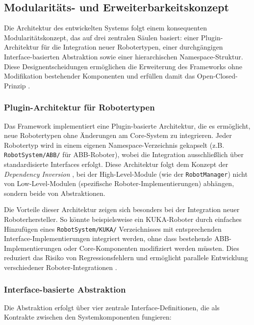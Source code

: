 \subsection{Modularitäts- und Erweiterbarkeitskonzept}

Die Architektur des entwickelten Systems folgt einem konsequenten
Modularitätskonzept, das auf drei zentralen Säulen basiert: einer
Plugin-Architektur für die Integration neuer Robotertypen, einer durchgängigen
Interface-basierten Abstraktion sowie einer hierarchischen Namespace-Struktur.
Diese Designentscheidungen ermöglichen die Erweiterung des Frameworks ohne
Modifikation bestehender Komponenten und erfüllen damit das Open-Closed-Prinzip
\cite{martin2003agile}.

\subsubsection{Plugin-Architektur für Robotertypen}

Das Framework implementiert eine Plugin-basierte Architektur, die es
ermöglicht, neue Robotertypen ohne Änderungen am Core-System zu integrieren.
Jeder Robotertyp wird in einem eigenen Namespace-Verzeichnis gekapselt (z.B.
\texttt{RobotSystem/ABB/} für ABB-Roboter), wobei die Integration
ausschließlich über standardisierte Interfaces erfolgt. Diese Architektur folgt
dem Konzept der \emph{Dependency Inversion} \cite{martin2000design}, bei der
High-Level-Module (wie der \texttt{RobotManager}) nicht von Low-Level-Modulen
(spezifische Roboter-Implementierungen) abhängen, sondern beide von
Abstraktionen.

Die Vorteile dieser Architektur zeigen sich besonders bei der Integration neuer
Roboterhersteller. So könnte beispielsweise ein KUKA-Roboter durch einfaches
Hinzufügen eines \texttt{RobotSystem/KUKA/} Verzeichnisses mit entsprechenden
Interface-Implementierungen integriert werden, ohne dass bestehende
ABB-Implementierungen oder Core-Komponenten modifiziert werden müssten. Dies
reduziert das Risiko von Regressionsfehlern und ermöglicht parallele
Entwicklung verschiedener Roboter-Integrationen \cite{gamma1995design}.

\subsubsection{Interface-basierte Abstraktion}

Die Abstraktion erfolgt über vier zentrale Interface-Definitionen, die als
Kontrakte zwischen den Systemkomponenten fungieren:

